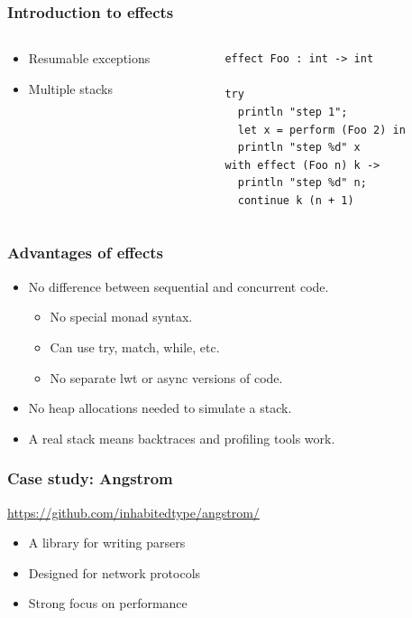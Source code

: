\documentclass{beamer}
\newcommand\mlkeyword[1]{{\ttfamily\color{darkblue} #1}}
\begin{document}
\begin{frame}[fragile]
	\frametitle{Introduction to effects}
	\begin{columns}[t]
		\begin{column}{4.5cm}
	\begin{itemize}
		\item Resumable exceptions
		\item Multiple stacks
	\end{itemize}
		\end{column}
		\begin{column}{5cm}
\begin{lstlisting}[style=ocaml]
effect Foo : int -> int

try
  println "step 1";
  let x = perform (Foo 2) in
  println "step %d" x
with effect (Foo n) k ->
  println "step %d" n;
  continue k (n + 1)
\end{lstlisting}
		\end{column}
	\end{columns}
\end{frame}

\begin{frame}
	\frametitle{Advantages of effects}
	\begin{itemize}
		\item No difference between sequential and concurrent code.
			\begin{itemize}
				\item No special monad syntax.
				\item Can use \mlkeyword{try}, \mlkeyword{match}, \mlkeyword{while}, etc.
				\item No separate lwt or async versions of code.
			\end{itemize}
		\item No heap allocations needed to simulate a stack.
		\item A real stack means backtraces and profiling tools work.
	\end{itemize}
\end{frame}

\begin{frame}
	\frametitle{Case study: Angstrom}

	\url{https://github.com/inhabitedtype/angstrom/}
	\bigskip
	\begin{itemize}
		\item A library for writing parsers
		\item Designed for network protocols
		\item Strong focus on performance
	\end{itemize}
\end{frame}
\end{document}
